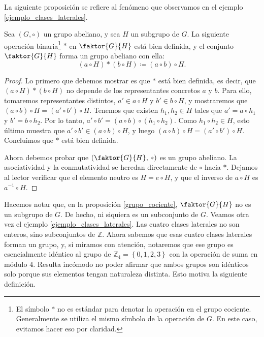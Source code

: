 La siguiente proposición se refiere al fenómeno que observamos en el ejemplo \ref{ejemplo_clases_laterales}.

\begin{prop} \label{grupo_cociente}
Sea $(G, \circ)$ un grupo abeliano, y sea $H$ un subgrupo de $G$. La siguiente operación binaria\footnote{El símbolo $\ast$ no es estándar para denotar la operación en el grupo cociente. Generalmente se utiliza el mismo símbolo de la operación de $G$. En este caso, evitamos hacer eso por claridad.} $\ast$ en $\faktor{G}{H}$ está bien definida, y el conjunto $\faktor{G}{H}$ forma un grupo abeliano con ella:
$$\left(a \circ H \right) \ast \left( b \circ H \right) \coloneqq  (a \circ b) \circ H .$$
\end{prop}

\begin{proof}
Lo primero que debemos mostrar es que $\ast$ está bien definida, es decir, que $\left(a \circ H \right) \ast \left( b \circ H \right)$ no depende de los representantes concretos $a$ y $b$. Para ello, tomaremos representantes distintos, $a' \in a \circ H$ y $b' \in b \circ H$, y mostraremos que $(a \circ b) \circ H = (a' \circ b') \circ H$. Tenemos que existen $h_1, h_2 \in H$ tales que $a' = a \circ h_1$ y $b' = b \circ h_2$. Por lo tanto, $a' \circ b' = (a \circ b) \circ (h_1 \circ h_2)$. Como $h_1 \circ h_2 \in H$, esto último muestra que $a' \circ b' \in (a \circ b) \circ H$, y luego $(a \circ b) \circ H = (a' \circ b') \circ H$. Concluimos que $\ast$ está bien definida.

Ahora debemos probar que $\left(\faktor{G}{H},\, \ast\right)$ es un grupo abeliano. La asociatividad y la conmutatividad se heredan directamente de $\circ$ hacia $\ast$. Dejamos al lector verificar que el elemento neutro es $H = e \circ H$, y que el inverso de $a \circ H$ es $a^{-1} \circ H$.
\end{proof}

Hacemos notar que, en la proposición \ref{grupo_cociente}, $\faktor{G}{H}$ no es un subgrupo de $G$. De hecho, ni siquiera es un subconjunto de $G$. Veamos otra vez el ejemplo \ref{ejemplo_clases_laterales}. Las cuatro clases laterales no son enteros, sino subconjuntos de $\mathbb{Z}$. Ahora sabemos que esas cuatro clases laterales forman un grupo, y, si miramos con atención, notaremos que ese grupo es esencialmente idéntico al grupo de $\mathbb{Z}_4 = \left\{0, 1, 2, 3\right\}$ con la operación de suma en módulo $4$. Resulta incómodo no poder afirmar que ambos grupos son idénticos solo porque sus elementos tengan naturaleza distinta. Esto motiva la siguiente definición.

